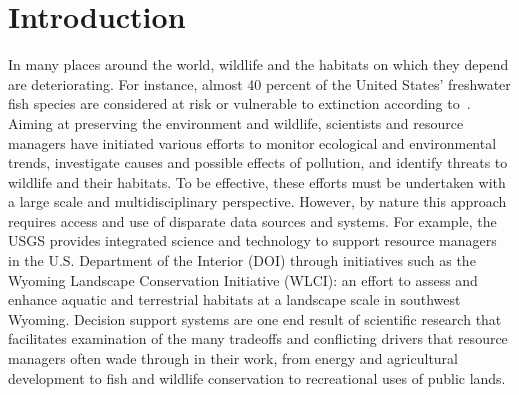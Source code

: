 \documentclass[letterpaper]{report}
\begin{document}
\tableofcontents

\cleardoublepage
\listoffigures
{}

\cleardoublepage
\listoftables
{}

\cleardoublepage
\lstlistoflistings
{}

\chapter{Introduction}
\label{introduction}
In many places around the world, wildlife and the habitats on which they depend are deteriorating. For instance, almost 40 percent of the United States' freshwater fish species are considered at risk or vulnerable to extinction according to~\cite{fish}. Aiming at preserving the environment and wildlife, scientists and resource managers have initiated various efforts to monitor ecological and environmental trends, investigate causes and possible effects of pollution, and identify threats to wildlife and their habitats. To be effective, these efforts must be undertaken with a large scale and multidisciplinary perspective.  However, by nature this approach requires access and use of disparate data sources and systems. For example, the USGS provides integrated science and technology to support resource managers in the U.S. Department of the Interior (DOI) through initiatives such as the Wyoming Landscape Conservation Initiative (WLCI): an effort to assess and enhance aquatic and terrestrial habitats at a landscape scale in southwest Wyoming. Decision support systems are one end result of scientific research that facilitates examination of the many tradeoffs and conflicting drivers that resource managers often wade through in their work, from energy and agricultural development to fish and wildlife conservation to recreational uses of public lands. 
\end{document}
